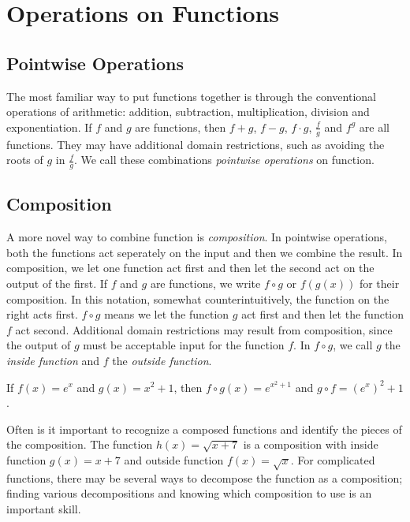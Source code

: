 \documentclass[fleqn]{report}
\begin{document}
\section{Operations on Functions}
\label{operations-on-functions}

\subsection{Pointwise Operations}
\label{pointwise-operations}

The most familiar way to put functions together is through the
conventional operations of arithmetic: addition, subtraction,
multiplication, division and exponentiation. If $f$ and $g$
are functions, then $f+g$, $f-g$, $f \cdot g$, $\frac{f}{g}$
and $f^g$ are all functions. They may have additional domain
restrictions, such as avoiding the roots of $g$ in
$\frac{f}{g}$. We call these combinations \emph{pointwise
operations} on function. 

\subsection{Composition}
\label{composition}

A more novel way to combine function is \emph{composition}.
In pointwise operations, both the functions act seperately on
the input and then we combine the result. In composition, we
let one function act first and then let the second act on the
output of the first. If $f$ and $g$ are functions, we write
$f \circ g$ or $f(g(x))$ for their composition. In this
notation, somewhat counterintuitively, the function on the
right acts first. $f \circ g$ means we let the function $g$
act first and then let the function $f$ act second. Additional
domain restrictions may result from composition, since the
output of $g$ must be acceptable input for the function $f$.
In $f \circ g$, we call $g$ the \emph{inside function} and $f$
the \emph{outside function}.

\begin{example}
If $f(x) = e^x$ and $g(x) = x^2+1$, then
$f \circ g (x) = e^{x^2+1}$ and $g \circ f = (e^x)^2
+1$. 
\end{example}

\begin{example}
Often is it important to recognize a composed functions and
identify the pieces of the composition. 
The function $h(x) = \sqrt{x+7}$ is a composition with inside
function $g(x) = x+7$ and outside function $f(x) = \sqrt{x}$.
For complicated functions, there may be several ways to
decompose the function as a composition; finding various
decompositions and knowing which composition to use is an
important skill.
\end{example}
\end{document}
